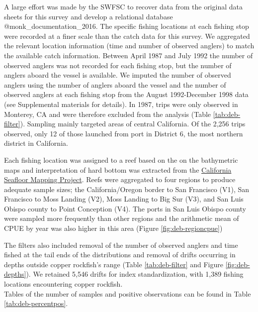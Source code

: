 \documentclass[11pt,
  letterpaper,
]{article}
\begin{document}
A large effort was made by the SWFSC to recover data from the original data sheets for this survey and develop a relational database @monk\_documentation\_2016. The specific fishing locations at each fishing stop were recorded at a finer scale than the catch data for this survey. We aggregated the relevant location information (time and number of observed anglers) to match the available catch information. Between April 1987 and July 1992 the number of observed anglers was not recorded for each fishing stop, but the number of anglers aboard the vessel is available. We imputed the number of observed anglers using the number of anglers aboard the vessel and the number of observed anglers at each fishing stop from the August 1992-December 1998 data (see Supplemental materials for details). In 1987, trips were only observed in Monterey, CA and were therefore excluded from the analysis (Table \ref{tab:deb-filter}). Sampling mainly targeted areas of central California. Of the 2,256 trips observed, only 12 of those launched from port in District 6, the most northern district in California.

Each fishing location was assigned to a reef based on the on the bathymetric maps and interpretation of hard bottom was extracted from the \href{http://seafloor.otterlabs.org/index.html}{California Seafloor Mapping Project}. Reefs were aggregated to four regions to produce adequate sample sizes; the California/Oregon border to San Francisco (V1), San Francisco to Moss Landing (V2), Moss Landing to Big Sur (V3), and San Luis Obispo county to Point Conception (V4). The ports in San Luis Obispo county were sampled more frequently than other regions and the arithmetic mean of CPUE by year was also higher in this area (Figure \ref{fig:deb-regioncpue})

The filters also included removal of the number of observed anglers and time fished at the tail ends of the distributions and removal of drifts occurring in depths outside copper rockfish's range (Table \ref{tab:deb-filter} and Figure \ref{fig:deb-depths}). We retained 5,546 drifts for index standardization, with 1,389 fishing locations encountering copper rockfish.\\
Tables of the number of samples and positive observations can be found in Table \ref{tab:deb-percentpos}.
\end{document}

